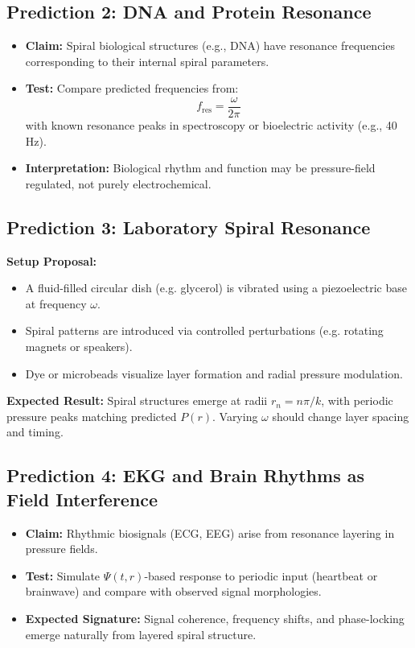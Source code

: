 \documentclass[a4paper,12pt]{article}
\begin{document}
\subsection{Prediction 2: DNA and Protein Resonance}

\begin{itemize}
    \item \textbf{Claim:} Spiral biological structures (e.g., DNA) have resonance frequencies corresponding to their internal spiral parameters.
    \item \textbf{Test:} Compare predicted frequencies from:
    \[
    f_{\text{res}} = \frac{\omega}{2\pi}
    \]
    with known resonance peaks in spectroscopy or bioelectric activity (e.g., 40 Hz).
    \item \textbf{Interpretation:} Biological rhythm and function may be pressure-field regulated, not purely electrochemical.
\end{itemize}

\subsection{Prediction 3: Laboratory Spiral Resonance}

\textbf{Setup Proposal:}

\begin{itemize}
    \item A fluid-filled circular dish (e.g. glycerol) is vibrated using a piezoelectric base at frequency \(\omega\).
    \item Spiral patterns are introduced via controlled perturbations (e.g. rotating magnets or speakers).
    \item Dye or microbeads visualize layer formation and radial pressure modulation.
\end{itemize}

\textbf{Expected Result:}  
Spiral structures emerge at radii \(r_n = n\pi / k\), with periodic pressure peaks matching predicted \(P(r)\). Varying \(\omega\) should change layer spacing and timing.

\subsection{Prediction 4: EKG and Brain Rhythms as Field Interference}

\begin{itemize}
    \item \textbf{Claim:} Rhythmic biosignals (ECG, EEG) arise from resonance layering in pressure fields.
    \item \textbf{Test:} Simulate \(\Psi(t, r)\)-based response to periodic input (heartbeat or brainwave) and compare with observed signal morphologies.
    \item \textbf{Expected Signature:} Signal coherence, frequency shifts, and phase-locking emerge naturally from layered spiral structure.
\end{itemize}
\end{document}
